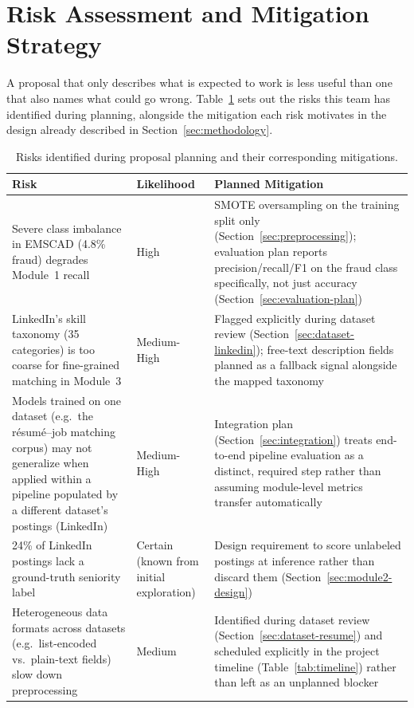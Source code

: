 \documentclass[11pt,a4paper]{article}
\begin{document}
\section{Risk Assessment and Mitigation Strategy}
\label{sec:risk}

A proposal that only describes what is expected to work is less useful than one that
also names what could go wrong. Table~\ref{tab:risks} sets out the risks this team has
identified during planning, alongside the mitigation each risk motivates in the design
already described in Section~\ref{sec:methodology}.

\begin{table}[h]
\centering
\small
\begin{tabular}{@{}p{4.4cm}p{2.6cm}p{6.2cm}@{}}
\toprule
\textbf{Risk} & \textbf{Likelihood} & \textbf{Planned Mitigation} \\
\midrule
Severe class imbalance in EMSCAD (4.8\% fraud) degrades Module~1 recall & High & SMOTE
oversampling on the training split only (Section~\ref{sec:preprocessing}); evaluation
plan reports precision/recall/F1 on the fraud class specifically, not just accuracy
(Section~\ref{sec:evaluation-plan}) \\[4pt]
LinkedIn's skill taxonomy (35 categories) is too coarse for fine-grained matching in
Module~3 & Medium-High & Flagged explicitly during dataset review
(Section~\ref{sec:dataset-linkedin}); free-text description fields planned as a fallback
signal alongside the mapped taxonomy \\[4pt]
Models trained on one dataset (e.g.\ the r\'esum\'e--job matching corpus) may not
generalize when applied within a pipeline populated by a different dataset's postings
(LinkedIn) & Medium-High & Integration plan (Section~\ref{sec:integration}) treats
end-to-end pipeline evaluation as a distinct, required step rather than assuming
module-level metrics transfer automatically \\[4pt]
24\% of LinkedIn postings lack a ground-truth seniority label & Certain (known from
initial exploration) & Design requirement to score unlabeled postings at inference
rather than discard them (Section~\ref{sec:module2-design}) \\[4pt]
Heterogeneous data formats across datasets (e.g.\ list-encoded vs.\ plain-text fields)
slow down preprocessing & Medium & Identified during dataset review
(Section~\ref{sec:dataset-resume}) and scheduled explicitly in the project timeline
(Table~\ref{tab:timeline}) rather than left as an unplanned blocker \\
\bottomrule
\end{tabular}
\caption{Risks identified during proposal planning and their corresponding mitigations.}
\label{tab:risks}
\end{table}
\end{document}
